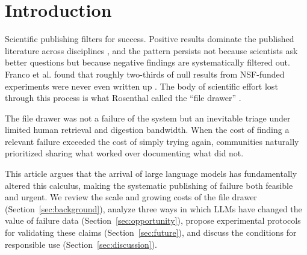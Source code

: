 \section{Introduction}
\label{sec:intro}

Scientific publishing filters for success. Positive results
dominate the published literature across disciplines
\citep{fanelli2012negative}, and the pattern persists not because
scientists ask better questions but because negative findings are
systematically filtered out. Franco et al. found that roughly
two-thirds of null results from NSF-funded experiments were never
even written up \citep{franco2014publication}. The body of
scientific effort lost through this process is what Rosenthal
called the ``file drawer'' \citep{rosenthal1979file}.

The file drawer was not a failure of the system but an inevitable
triage under limited human retrieval and digestion bandwidth. When
the cost of finding a relevant failure exceeded the cost of simply
trying again, communities naturally prioritized sharing what worked
over documenting what did not.

This article argues that the arrival of large language models has
fundamentally altered this calculus, making the systematic
publishing of failure both feasible and urgent. We review the scale
and growing costs of the file drawer
(Section~\ref{sec:background}), analyze three ways in which LLMs
have changed the value of failure data
(Section~\ref{sec:opportunity}), propose experimental protocols for
validating these claims (Section~\ref{sec:future}), and discuss the
conditions for responsible use (Section~\ref{sec:discussion}).